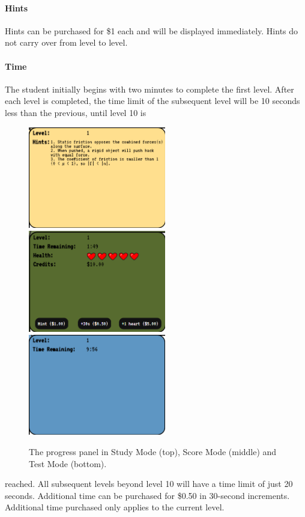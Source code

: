 \documentclass[12pt]{article}
\begin{document}
\paragraph{Hints}
Hints can be purchased for \$1 each and will be displayed immediately. Hints do not carry over from level to level.\par

\paragraph{Time}
The student initially begins with two minutes to complete the first level. After each level is completed, the time limit of the subsequent level will be 10 seconds less than the previous, until level 10 is 
\begin{figure}
    \centering
    \includegraphics[width=6cm]{studyModeProgressPanel.png}
    \includegraphics[width=6cm]{scoreModeProgressPanel.png}
    \includegraphics[width=6cm]{testModeProgressPanel.png}
    \caption{The progress panel in Study Mode (top), Score Mode (middle) and Test Mode (bottom).}
\end{figure}
reached. All subsequent levels beyond level 10 will have a time limit of just 20 seconds. Additional time can be purchased for \$0.50 in 30-second increments. Additional time purchased only applies to the current level.\par
\end{document}
